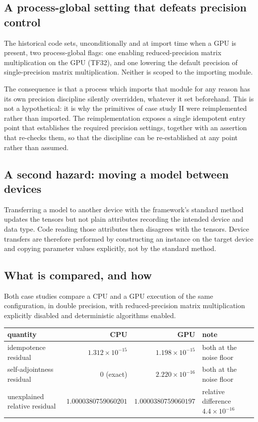 \documentclass[11pt]{amsart}
\theoremstyle{remark}
\begin{document}
\subsection{A process-global setting that defeats precision control}

The historical code sets, unconditionally and at import time when a GPU is present, two
process-global flags: one enabling reduced-precision matrix multiplication on the GPU
(TF32), and one lowering the default precision of single-precision matrix multiplication.
Neither is scoped to the importing module.

The consequence is that a process which imports that module for any reason has its own
precision discipline silently overridden, whatever it set beforehand. This is not a
hypothetical: it is why the primitives of case study II were reimplemented rather than
imported. The reimplementation exposes a single idempotent entry point that establishes the
required precision settings, together with an assertion that re-checks them, so that the
discipline can be re-established at any point rather than assumed.

\subsection{A second hazard: moving a model between devices}

Transferring a model to another device with the framework's standard method updates the
tensors but not plain attributes recording the intended device and data type. Code reading
those attributes then disagrees with the tensors. Device transfers are therefore performed
by constructing an instance on the target device and copying parameter values explicitly,
not by the standard method.

\subsection{What is compared, and how}

Both case studies compare a CPU and a GPU execution of the same configuration, in double
precision, with reduced-precision matrix multiplication explicitly disabled and
deterministic algorithms enabled.

\begin{center}
\small
\begin{tabularx}{\linewidth}{@{}lrrX@{}}
\toprule
quantity & CPU & GPU & note \\
\midrule
idempotence residual & $1.312\times10^{-15}$ & $1.198\times10^{-15}$ & both at the noise floor \\
self-adjointness residual & $0$ (exact) & $2.220\times10^{-16}$ & both at the noise floor \\
unexplained relative residual & $1.0000380759060201$ & $1.0000380759060197$ & relative difference $4.4\times10^{-16}$ \\
\bottomrule
\end{tabularx}
\end{center}
\end{document}
